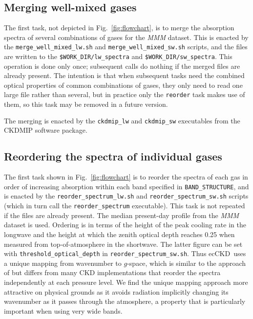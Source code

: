 \documentclass[a4,oneside]{article}
\def\codesize{\small}
\newcommand{\ecckd}{ecCKD}
\def\codesize{\small}
\def\code#1{{\codesize\texttt{#1}}}
\begin{document}
\subsection{Merging well-mixed gases}
\label{sec:merge}
The first task, not depicted in Fig.\ \ref{fig:flowchart}, is to merge
the absorption spectra of several combinations of gases for the
\emph{MMM} dataset. This is enacted by the
\code{merge\_well\_mixed\_lw.sh} and \code{merge\_well\_mixed\_sw.sh}
scripts, and the files are written to the
\code{\$WORK\_DIR/lw\_spectra} and
\code{\$WORK\_DIR/sw\_spectra}. This operation is done only once;
subsequent calls do nothing if the merged files are already
present. The intention is that when subsequent tasks need the combined
optical properties of common combinations of gases, they only need to
read one large file rather than several, but in practice only the
\code{reorder} task makes use of them, so this task may be removed in
a future version.

The merging is enacted by the \code{ckdmip\_lw} and \code{ckdmip\_sw}
executables from the CKDMIP software package.

\subsection{Reordering the spectra of individual gases}
The first task shown in Fig.\ \ref{fig:flowchart} is to reorder the
spectra of each gas in order of increasing absorption within each band
specified in \code{BAND\_STRUCTURE}, and is enacted by the
\code{reorder\_spectrum\_lw.sh} and \code{reorder\_spectrum\_sw.sh}
scripts (which in turn call the \code{reorder\_spectrum}
executable). This task is not repeated if the files are already
present. The median present-day profile from the \emph{MMM} dataset is
used. Ordering is in terms of the height of the peak cooling rate in
the longwave \citep[see][for details]{Hogan2010} and the height at
which the zenith optical depth reaches 0.25 when measured from
top-of-atmosphere in the shortwave. The latter figure can be set with
\code{threshold\_optical\_depth} in
\code{reorder\_spectrum\_sw.sh}. Thus \ecckd\ uses a unique mapping
from wavenumber to $g$-space, which is similar to the approach of
\cite{Doppler+2014} but differs from many CKD implementations that
reorder the spectra independently at each pressure level. We find the
unique mapping approach more attractive on physical grounds as it
avoids radiation implicitly changing its wavenumber as it passes
through the atmosphere, a property that is particularly important when
using very wide bands.
\end{document}
